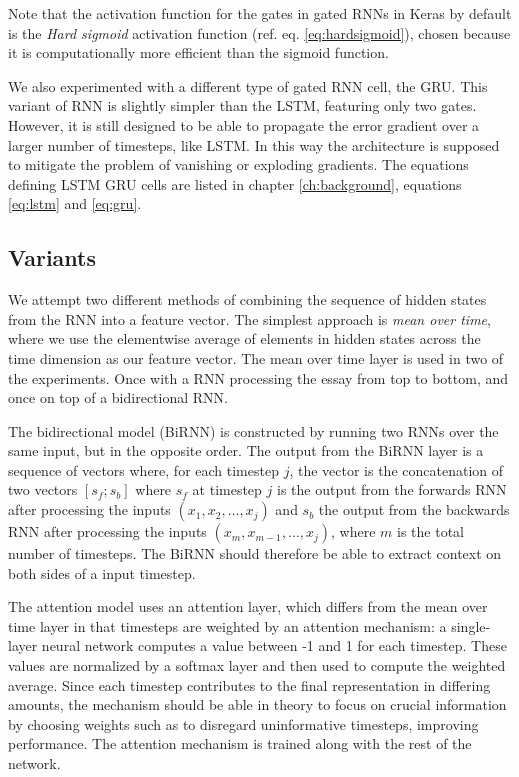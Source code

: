 Note that the activation function for the gates in gated RNNs in Keras by
default is the \emph{Hard sigmoid} activation function (ref. eq.
\ref{eq:hardsigmoid}), chosen because it is computationally more efficient
than the sigmoid function.

We also experimented with a different type of gated \ac{RNN} cell, the
\ac{GRU}. This variant of \ac{RNN} is slightly simpler than the \ac{LSTM},
featuring only two gates. However, it is still designed to be able to
propagate the error gradient over a larger number of timesteps, like
\ac{LSTM}. In this way the architecture is supposed to mitigate the problem
of vanishing or exploding gradients. The equations defining \ac{LSTM}
\ac{GRU} cells are listed in chapter \ref{ch:background}, equations
\ref{eq:lstm} and \ref{eq:gru}.


\subsection{Variants}

We attempt two different methods of combining the sequence of hidden states
from the \ac{RNN} into a feature vector. The simplest approach is \emph{mean
over time}, where we use the elementwise average of elements in hidden states
across the time dimension as our feature vector. The mean over time layer is
used in two of the experiments. Once with a \ac{RNN} processing the essay
from top to bottom, and once on top of a bidirectional RNN.

The bidirectional model (BiRNN) is constructed by running two \acp{RNN} over
the same input, but in the opposite order. The output from the BiRNN layer is
a sequence of vectors where, for each timestep $j$, the vector is the
concatenation of two vectors $[s_f;s_b]$ where $s_f$ at timestep $j$ is the
output from the forwards \ac{RNN} after processing the inputs $(x_1, x_2,
\ldots, x_j)$ and $s_b$ the output from the backwards \ac{RNN} after
processing the inputs $(x_m, x_{m-1}, \ldots, x_j)$, where $m$ is the total
number of timesteps. The BiRNN should therefore be able to extract context on
both sides of a input timestep.


The attention model uses an attention layer, which differs from the mean over
time layer in that timesteps are weighted by an attention mechanism: a
single-layer neural network computes a value between -1 and 1 for each
timestep. These values are normalized by a softmax layer and then used to
compute the weighted average. Since each timestep contributes to the final
representation in differing amounts, the mechanism should be able in theory
to focus on crucial information by choosing weights such as to disregard
uninformative timesteps, improving performance. The attention mechanism is
trained along with the rest of the network.

